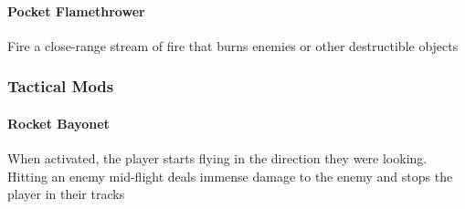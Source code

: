 \documentclass[../Main.tex]{subfiles}
\begin{document}
\paragraph{Pocket Flamethrower} 

Fire a close-range stream of fire that burns enemies or other destructible objects

\subsubsection{Tactical Mods}

\paragraph{Rocket Bayonet}

When activated, the player starts flying in the direction they were looking. Hitting an enemy mid-flight deals immense damage to the enemy and stops the player in their tracks
\end{document}
